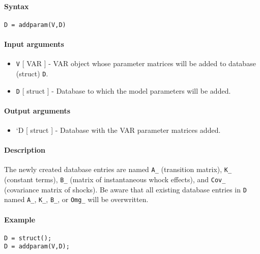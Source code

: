 


	\paragraph{Syntax}

\begin{verbatim}
D = addparam(V,D)
\end{verbatim}

\paragraph{Input arguments}

\begin{itemize}
\item
  \texttt{V} {[} VAR {]} - VAR object whose parameter matrices will be
  added to database (struct) \texttt{D}.
\item
  \texttt{D} {[} struct {]} - Database to which the model parameters
  will be added.
\end{itemize}

\paragraph{Output arguments}

\begin{itemize}
\itemsep1pt\parskip0pt
\item
  `D {[} struct {]} - Database with the VAR parameter matrices added.
\end{itemize}

\paragraph{Description}

The newly created database entries are named \texttt{A\_} (transition
matrix), \texttt{K\_} (constant terms), \texttt{B\_} (matrix of
instantaneous whock effects), and \texttt{Cov\_} (covariance matrix of
shocks). Be aware that all existing database entries in \texttt{D} named
\texttt{A\_}, \texttt{K\_}, \texttt{B\_}, or \texttt{Omg\_} will be
overwritten.

\paragraph{Example}

\begin{verbatim}
D = struct();
D = addparam(V,D);
\end{verbatim}


